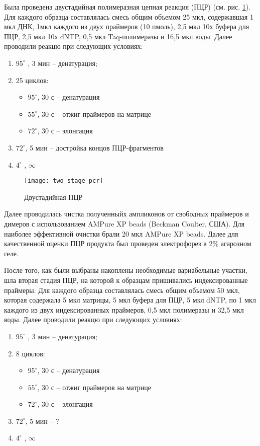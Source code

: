 Была проведена  двустадийная полимеразная цепная реакция (ПЦР) (см. рис. \ref{img:two_stage_pcr}). Для каждого образца составлялась смесь общим объемом 25 мкл, содержавшая 1 мкл ДНК, 1мкл каждого из двух праймеров (10 пмоль), 2,5 мкл 10х буфера для ПЦР, 2,5 мкл 10х dNTP, 0,5 мкл  Taq-полимеразы и 16,5 мкл воды. Далее проводили реакцю при следующих условиях:
\begin{enumerate}
	\item $95^{\circ}$ , 3 мин – денатурация;
	\item 25 циклов:
	\begin{itemize}
		\item $95^{\circ}$, 30 с – денатурация
		\item $55^{\circ}$, 30 с – отжиг праймеров на матрице
		\item $72^{\circ}$, 30 с – элонгация	
	\end{itemize}
	\item $72^{\circ}$, 5 мин – достройка концов ПЦР-фрагментов 
	\item  $4^{\circ}$ ,  $\infty$ 
\end{enumerate}

\begin{figure}[h]
  \texttt{[image: two\_stage\_pcr]}
  \centering
  \caption{Двустадийная ПЦР}
  \label{img:two_stage_pcr}  
\end{figure}

Далее проводилась чистка полученныйх ампликонов от свободных праймеров и димеров с использованием AMPure XP beads (Beckman Coulter, США). Для наиболее эффективной очистки брали  20 мкл AMPure XP beads. Далее для качественной оценки ПЦР продукта был проведен электрофорез в 2\% агарозном геле. 

После того, как были выбраны накоплены необходимые вариабельные участки, шла вторая стадия ПЦР, на которой к образцам пришивались индексированные праймеры.  Для каждого образца составлялась смесь общим объемом 50 мкл, которая содержала 5 мкл матрицы, 5 мкл буфера для ПЦР, 5 мкл dNTP, по 1 мкл каждого из двух индексированных праймеров, 0,5 мкл полимеразы и 32,5 мкл воды. Далее проводили реакцю при следующих условиях:
\begin{enumerate}
	\item $95^{\circ}$ , 3 мин – денатурация;
	\item 8 циклов:
	\begin{itemize}
		\item $95^{\circ}$, 30 с – денатурация
		\item $55^{\circ}$, 30 с – отжиг праймеров на матрице
		\item $72^{\circ}$, 30 с – элонгация
	\end{itemize}
	\item $72^{\circ}$, 5 мин – ?
	\item $4^{\circ}$ ,  $\infty$
\end{enumerate}

